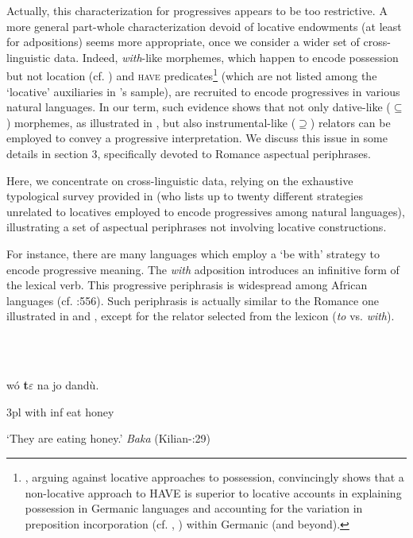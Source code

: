 \documentclass[output=paper,colorlinks,citecolor=brown]{./langscibook}
\begin{document}
Actually, this characterization for progressives appears to be too restrictive. A more general part-whole characterization devoid of locative endowments (at least for adpositions) seems more appropriate, once we consider a wider set of cross-linguistic data. Indeed, \textit{with}{}-like morphemes, which happen to encode possession but not location (cf. \citealt{Levinson2011}) and \textsc{have} predicates\footnote{\citet{Levinson2011}, arguing against locative approaches to possession, convincingly shows that a non-locative approach to HAVE is superior to locative accounts in explaining possession in Germanic languages and accounting for the variation in preposition incorporation (cf. \citealt{Kayne1993}, \citealt{Harley2002}) within Germanic (and beyond).} (which are not listed among the ‘locative’ auxiliaries in \citeauthor{BybeePerkinsPagliuca1994}’s sample), are recruited to encode progressives in various natural languages. In our term, such evidence shows that not only dative-like (${\subseteq}$) morphemes, as illustrated in , but also instrumental-like (${\supseteq}$) relators can be employed to convey a progressive interpretation. We discuss this issue in some details in section 3, specifically devoted to Romance aspectual periphrases. 

Here, we concentrate on cross-linguistic data, relying on the exhaustive typological survey provided in \citet{Cinque2017} (who lists up to twenty different strategies unrelated to locatives employed to encode progressives among natural languages), illustrating a set of aspectual periphrases not involving locative constructions. 

For instance, there are many languages which employ a ‘be with’ strategy to encode progressive meaning. The \textit{with} adposition introduces an infinitive form of the lexical verb. This progressive periphrasis is widespread among African languages (cf. \citealt{Cinque2017}:556). Such periphrasis is actually similar to the Romance one illustrated in  and , except for the relator selected from the lexicon (\textit{to} vs. \textit{with}).

\ea%
    \label{ex:key:12}
    \gll\\
        \\
    \glt
    \z

           wó  \textbf{t$\varepsilon$}   na   jo   dandù.

3pl   with   inf   eat   honey

‘They are eating honey.’     \textit{Baka} (Kilian-\citealt{Hatz1992}:29)
\end{document}
